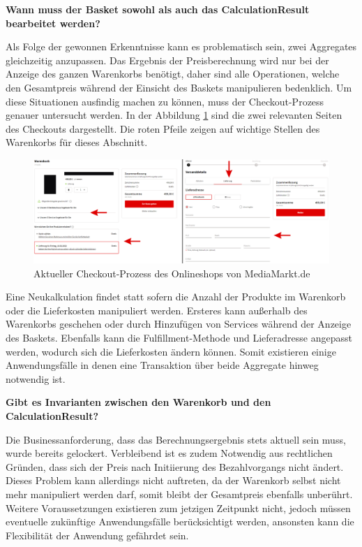 \textbf{Wann muss der Basket sowohl als auch das CalculationResult bearbeitet werden?}


Als Folge der gewonnen Erkenntnisse kann es problematisch sein, zwei Aggregates gleichzeitig anzupassen. Das Ergebnis der Preisberechnung wird nur bei der Anzeige des ganzen Warenkorbs benötigt, daher sind alle Operationen, welche den Gesamtpreis während der Einsicht des Baskets manipulieren bedenklich. Um diese Situationen ausfindig machen zu können, muss der Checkout-Prozess genauer untersucht werden. In der Abbildung \ref{fig:Checkout-Process} sind die zwei relevanten Seiten des Checkouts dargestellt. Die roten Pfeile zeigen auf wichtige Stellen des Warenkorbs für dieses Abschnitt.

\vspace{0.5cm}
\begin{figure}[htbp]
	\centering
	\includegraphics[width=\linewidth]{bilder/Checkout.png}
	\caption{Aktueller Checkout-Prozess des Onlineshops von MediaMarkt.de}
	\label{fig:Checkout-Process}
\end{figure}

Eine Neukalkulation findet statt sofern die Anzahl der Produkte im Warenkorb oder die Lieferkosten manipuliert werden. Ersteres kann außerhalb des Warenkorbs geschehen oder durch Hinzufügen von Services während der Anzeige des Baskets. Ebenfalls kann die Fulfillment-Methode und Lieferadresse angepasst werden, wodurch sich die Lieferkosten ändern können. Somit existieren einige Anwendungsfälle in denen eine Transaktion über beide Aggregate hinweg notwendig ist.

\textbf{Gibt es Invarianten zwischen den Warenkorb und den CalculationResult?}

Die Businessanforderung, dass das Berechnungsergebnis stets aktuell sein muss, wurde bereits gelockert. Verbleibend ist es zudem Notwendig aus rechtlichen Gründen, dass sich der Preis nach Initiierung des Bezahlvorgangs nicht ändert. Dieses Problem kann allerdings nicht auftreten, da der Warenkorb selbst nicht mehr manipuliert werden darf, somit bleibt der Gesamtpreis ebenfalls unberührt. Weitere Voraussetzungen existieren zum jetzigen Zeitpunkt nicht, jedoch müssen eventuelle zukünftige Anwendungsfälle berücksichtigt werden, ansonsten kann die Flexibilität der Anwendung gefährdet sein. 

